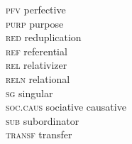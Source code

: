 \documentclass[output=paper]{langscibook}
\begin{document}
\begin{multicols}{2}
\begin{tabbing}
\textsc{pfv} \> perfective\\
\textsc{purp}  \> purpose\\
\textsc{red}  \> reduplication\\
\textsc{ref}  \> referential\\
\textsc{rel}  \> relativizer\\
\textsc{reln}  \> relational\\
\textsc{sg}  \> singular\\
\textsc{soc.caus} \> sociative causative\\
\textsc{sub} \> subordinator\\
\textsc{transf} \> transfer
\end{tabbing}
\end{multicols}

\printbibliography[heading=subbibliography,notkeyword=this]
\end{document}
